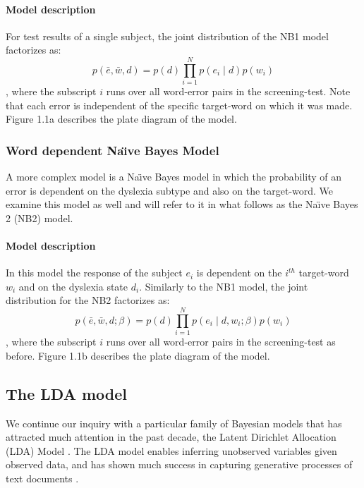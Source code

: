 \paragraph{Model description}
For test results of a single subject, the joint distribution of the NB1 model factorizes as:
\[ p(\bar{e}, \bar{w}, d) = p(d) \prod_{i=1}^N p(e_i \mid d) p(w_i) \] \quad ,
where the subscript $ i $ runs over all word-error pairs in the screening-test. Note that each error is independent of the specific target-word on which it was made. Figure 1.1a describes the plate diagram of the model.

\subsubsection{Word dependent Na\"{\i}ve Bayes Model}
A more complex model is a Na\"{\i}ve Bayes model in which the probability of an error is dependent on the dyslexia subtype and also on the target-word. We examine this model as well and will refer to it in what follows as the Na\"{\i}ve Bayes 2 (NB2) model.

\vfill

\paragraph{Model description}
In this model the response of the subject $ e_i $ is dependent on the $ i^{th} $ target-word $ w_i $ and on the dyslexia state $ d_i $. Similarly to the NB1 model, the joint distribution for the NB2 factorizes as:
\[ p(\bar{e}, \bar{w}, d ; \beta) = p(d) \prod_{i=1}^N p(e_i \mid d, w_i ; \beta) p(w_i) \] \quad ,
where the subscript $i$ runs over all word-error pairs in the screening-test as before. Figure 1.1b describes the plate diagram of the model.

\subsection{The LDA model}
We continue our inquiry with a particular family of Bayesian models that has attracted much attention in the past decade, the Latent Dirichlet Allocation (LDA) Model \citep{bnj03}. The LDA model enables inferring unobserved variables given observed data, and has shown much success in capturing generative processes of text documents \citep{bnj03, rgss04}.

